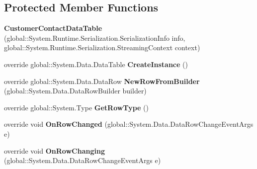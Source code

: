 \subsection*{Protected Member Functions}
\begin{DoxyCompactItemize}
\item 
{\bfseries Customer\+Contact\+Data\+Table} (global\+::\+System.\+Runtime.\+Serialization.\+Serialization\+Info info, global\+::\+System.\+Runtime.\+Serialization.\+Streaming\+Context context)\hypertarget{class_products_1_1_data_1_1ds_sage_1_1_customer_contact_data_table_a70199447e12eebe27d8b8aa4694b5909}{}\label{class_products_1_1_data_1_1ds_sage_1_1_customer_contact_data_table_a70199447e12eebe27d8b8aa4694b5909}

\item 
override global\+::\+System.\+Data.\+Data\+Table {\bfseries Create\+Instance} ()\hypertarget{class_products_1_1_data_1_1ds_sage_1_1_customer_contact_data_table_aae8e9378d2848176f218f16367415549}{}\label{class_products_1_1_data_1_1ds_sage_1_1_customer_contact_data_table_aae8e9378d2848176f218f16367415549}

\item 
override global\+::\+System.\+Data.\+Data\+Row {\bfseries New\+Row\+From\+Builder} (global\+::\+System.\+Data.\+Data\+Row\+Builder builder)\hypertarget{class_products_1_1_data_1_1ds_sage_1_1_customer_contact_data_table_a7d9dfc68486207496ee2d129f5eaccdf}{}\label{class_products_1_1_data_1_1ds_sage_1_1_customer_contact_data_table_a7d9dfc68486207496ee2d129f5eaccdf}

\item 
override global\+::\+System.\+Type {\bfseries Get\+Row\+Type} ()\hypertarget{class_products_1_1_data_1_1ds_sage_1_1_customer_contact_data_table_a62b9681c52166f3088f7d70060a3ceda}{}\label{class_products_1_1_data_1_1ds_sage_1_1_customer_contact_data_table_a62b9681c52166f3088f7d70060a3ceda}

\item 
override void {\bfseries On\+Row\+Changed} (global\+::\+System.\+Data.\+Data\+Row\+Change\+Event\+Args e)\hypertarget{class_products_1_1_data_1_1ds_sage_1_1_customer_contact_data_table_a0ff48d439d8d5a8cd27f5c3f9e6f6c23}{}\label{class_products_1_1_data_1_1ds_sage_1_1_customer_contact_data_table_a0ff48d439d8d5a8cd27f5c3f9e6f6c23}

\item 
override void {\bfseries On\+Row\+Changing} (global\+::\+System.\+Data.\+Data\+Row\+Change\+Event\+Args e)\hypertarget{class_products_1_1_data_1_1ds_sage_1_1_customer_contact_data_table_ae644269ea4891b9753f5a3c44aaaacb9}{}\label{class_products_1_1_data_1_1ds_sage_1_1_customer_contact_data_table_ae644269ea4891b9753f5a3c44aaaacb9}


\end{DoxyCompactItemize}
